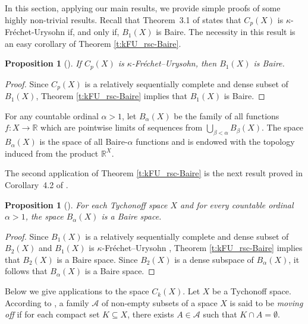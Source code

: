 \documentclass[preprint,11pt]{elsarticle}
\newtheorem{proposition}[theorem]{Proposition}
\theoremstyle{definition}
\theoremstyle{remark}
\numberwithin{equation}{section}
\numberwithin{theorem}{section}
\newcommand{\IR}{\mathbb{R}}
\newcommand{\AAA}{\mathcal{A}}
\newcommand{\CC}{C_k}
\begin{document}

In this section, applying our main results, we provide simple proofs of some highly non-trivial results.
Recall that  Theorem~3.1 of \cite{Osipov-252} states that $C_p(X)$ is $\kappa$-Fr\'{e}chet-Urysohn if, and only if, $B_1(X)$ is Baire. The necessity in this result is an easy corollary of Theorem \ref{t:kFU_rsc-Baire}.

\begin{proposition}[]\label{p:kappa-baire1}
If $C_p(X)$ is $\kappa$-Fr\'{e}chet--Urysohn, then $B_1(X)$ is Baire.
\end{proposition}
\begin{proof}
Since $C_p(X)$ is a relatively sequentially complete and dense subset of $B_1(X)$, Theorem \ref{t:kFU_rsc-Baire} implies that $B_1(X)$ is Baire.
\end{proof}


For any countable ordinal $\alpha>1$, let $B_\alpha(X)$ be the family of all functions $f:X\to \IR$ which are pointwise limits of sequences from $\bigcup_{\beta<\alpha}B_\beta(X)$. The space $B_\alpha(X)$ is the space of all Baire-$\alpha$ functions and is endowed with the topology induced from the product $\IR^X$.

The second application of Theorem \ref{t:kFU_rsc-Baire} is the next result proved in Corollary~4.2 of \cite{BG-Baire}.

\begin{proposition}[]\label{p:baire2}
For each Tychonoff space $X$ and for every countable ordinal $\alpha>1$, the space $B_{\alpha}(X)$ is a  Baire space.
\end{proposition}
\begin{proof}
Since $B_1(X)$ is a relatively sequentially complete and dense subset of $B_2(X)$ and $B_1(X)$ is $\kappa$-Fr\'{e}chet--Urysohn  \cite[Theorem 5.15]{Gabr-seq-Ascoli}, Theorem \ref{t:kFU_rsc-Baire} implies that $B_2(X)$ is a Baire space. Since $B_2(X)$  is a dense subspace of $B_\alpha(X)$, it follows that $B_{\alpha}(X)$ is a  Baire space.
\end{proof}



Below we give applications to the space $\CC(X)$.
Let $X$ be a Tychonoff space. According to \cite{mcoy}, a family $\AAA$ of non-empty subsets of a space $X$ is said to be {\em moving off} if for each compact set $K\subseteq X$, there exists $A\in\AAA$ such that $K\cap A=\emptyset$.
\end{document}
